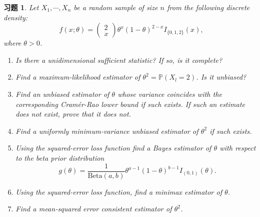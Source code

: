 \documentclass[a4paper,oneside,12pt]{ctexart}
\theoremstyle{plain}
\newtheorem{exercise}{习题}
\theoremstyle{nonumberplain}
\theoremstyle{nonumberplain}
\newcommand{\prob}{\mathbb{P}}
\newcommand{\Beta}{\mathrm{Beta}}
\begin{document}
    \begin{exercise}
        \label{ex:47}
        Let $X_1,\cdots,X_n$ be a random sample of size $n$ from the following discrete density: 
        \begin{equation*}
            f(x;\theta)=\begin{pmatrix}
                2\\
                x
            \end{pmatrix}\theta^x(1-\theta)^{2-x}I_{\{0,1,2\}}(x),
        \end{equation*}
        where $\theta>0$.

        \begin{enumerate}[($a$)]
            \item Is there a unidimensional sufficient statistic? If so, is it complete?
            \item Find a maximum-likelihood estimator of $\theta^2=\prob(X_l=2)$. Is it unbiased?
            \item Find an unbiased estimator of $\theta$ whose variance coincides with the corresponding Cram\'er-Rao lower bound if such 
            exists. If such an estimate does not exist, prove that it does not.
            \item Find a uniformly minimum-variance unbiased estimator of $\theta^2$ if such exists.
            \item Using the squared-error loss function find a Bayes estimator of $\theta$ with respect to the beta prior distribution \begin{equation*}
                g(\theta)=\frac{1}{\Beta(a,b)}\theta^{a-1}(1-\theta)^{b-1}I_{(0,1)}(\theta).
            \end{equation*}
            \item Using the squared-error loss function, find a minimax estimator of $\theta$.
            \item Find a mean-squared error consistent estimator of $\theta^2$.
        \end{enumerate}
    \end{exercise}
\end{document}
